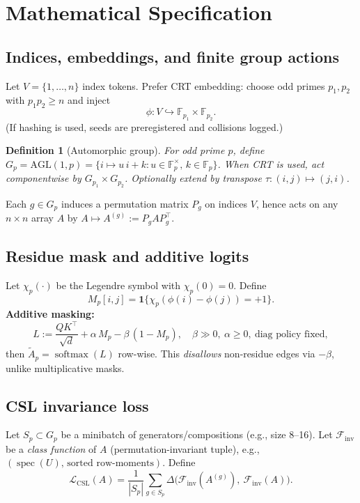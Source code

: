 \documentclass[11pt]{article}
\newtheorem{definition}{Definition}
\theoremstyle{remark}
\newcommand{\bbF}{\mathbb{F}}
\newcommand{\softmax}{\operatorname{softmax}}
\newcommand{\spec}{\operatorname{spec}}
\begin{document}
\section{Mathematical Specification}

\subsection{Indices, embeddings, and finite group actions}
Let $V=\{1,\dots,n\}$ index tokens. Prefer CRT embedding: choose odd primes $p_1,p_2$ with $p_1p_2\ge n$ and inject
\[
  \phi:V\hookrightarrow \bbF_{p_1}\times \bbF_{p_2}.
\]
(If hashing is used, seeds are preregistered and collisions logged.)

\begin{definition}[Automorphic group]
For odd prime $p$, define $G_p=\mathrm{AGL}(1,p)=\{i\mapsto u\,i + k: u\in\bbF_p^\times,\, k\in\bbF_p\}$.
When CRT is used, act componentwise by $G_{p_1}\times G_{p_2}$. Optionally extend by transpose $\tau:(i,j)\mapsto (j,i)$.
\end{definition}

Each $g\in G_p$ induces a permutation matrix $P_g$ on indices $V$, hence acts on any $n\times n$ array $A$ by $A\mapsto A^{(g)}:=P_g A P_g^\top$.

\subsection{Residue mask and additive logits}
Let $\chi_p(\cdot)$ be the Legendre symbol with $\chi_p(0)=0$. Define
\[
  M_p[i,j] = \mathbf{1}\{\chi_p(\phi(i)-\phi(j))=+1\}.
\]
\textbf{Additive masking:}
\begin{equation}\label{eq:additive-logits}
  L := \frac{QK^\top}{\sqrt d} + \alpha\,M_p - \beta\,(1-M_p), \quad \beta\gg 0,\ \alpha\ge 0,\ \text{diag policy fixed},
\end{equation}
then $\widetilde A_p=\softmax(L)$ row-wise. This \emph{disallows} non-residue edges via $-\beta$, unlike multiplicative masks.

\subsection{CSL invariance loss}
Let $S_p\subset G_p$ be a minibatch of generators/compositions (e.g., size 8–16). Let $\mathcal F_{\mathrm{inv}}$ be a \emph{class function} of $A$ (permutation-invariant tuple), e.g., \((\spec(U),\,\text{sorted row-moments})\).
Define
\[
  \mathcal L_{\mathrm{CSL}}(A) = \frac{1}{|S_p|}\sum_{g\in S_p}\Delta\big(\mathcal F_{\mathrm{inv}}(A^{(g)}),\ \mathcal F_{\mathrm{inv}}(A)\big).
\]
\end{document}
